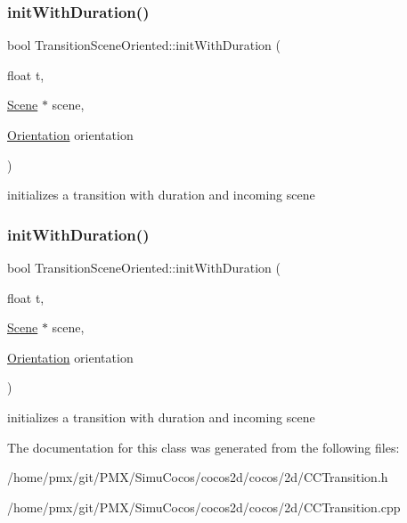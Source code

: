 \subsubsection{\texorpdfstring{init\+With\+Duration()}{initWithDuration()}\hspace{0.1cm}{\footnotesize\ttfamily [1/2]}}
{\footnotesize\ttfamily bool Transition\+Scene\+Oriented\+::init\+With\+Duration (\begin{DoxyParamCaption}\item[{float}]{t,  }\item[{\hyperlink{classScene}{Scene} $\ast$}]{scene,  }\item[{\hyperlink{classTransitionScene_a0b2b247806fb10a20de0cbc554210c4d}{Orientation}}]{orientation }\end{DoxyParamCaption})}

initializes a transition with duration and incoming scene \mbox{\label{classTransitionSceneOriented_ad20e3d07c7fb9f7717fe76301927a24b}} 
\subsubsection{\texorpdfstring{init\+With\+Duration()}{initWithDuration()}\hspace{0.1cm}{\footnotesize\ttfamily [2/2]}}
{\footnotesize\ttfamily bool Transition\+Scene\+Oriented\+::init\+With\+Duration (\begin{DoxyParamCaption}\item[{float}]{t,  }\item[{\hyperlink{classScene}{Scene} $\ast$}]{scene,  }\item[{\hyperlink{classTransitionScene_a0b2b247806fb10a20de0cbc554210c4d}{Orientation}}]{orientation }\end{DoxyParamCaption})}

initializes a transition with duration and incoming scene 

The documentation for this class was generated from the following files\+:\begin{DoxyCompactItemize}
\item 
/home/pmx/git/\+P\+M\+X/\+Simu\+Cocos/cocos2d/cocos/2d/C\+C\+Transition.\+h\item 
/home/pmx/git/\+P\+M\+X/\+Simu\+Cocos/cocos2d/cocos/2d/C\+C\+Transition.\+cpp\end{DoxyCompactItemize}
